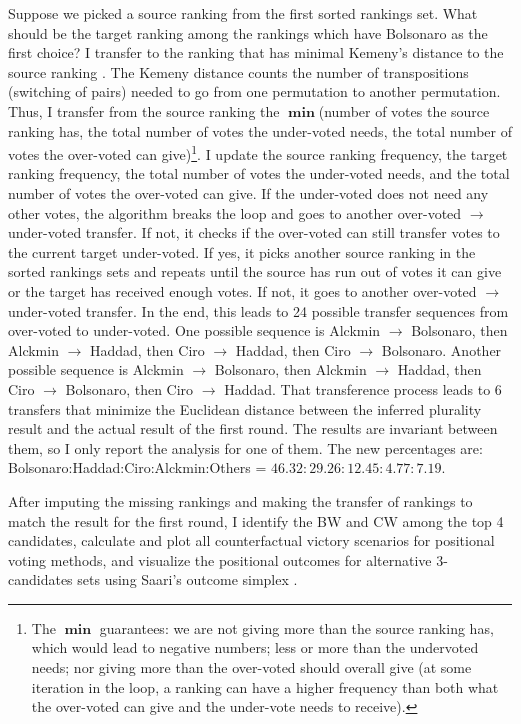 \documentclass[hidelinks,11pt]{article}
\begin{document}
Suppose we picked a source ranking from the first sorted rankings set. What
should be the target ranking among the rankings which have Bolsonaro as the
first choice? I transfer to the ranking that has minimal Kemeny's distance to
the source ranking \parencite{nurmi2002voting}. The Kemeny distance counts the
number of transpositions (switching of pairs) needed to go from one permutation
to another permutation. Thus, I transfer from the source ranking the
\(\operatorname{\mathbf{min}}\)(number of votes the source ranking has, the
total number of votes the under-voted needs, the total number of votes the
over-voted can give)\footnote{The \(\operatorname{\mathbf{min}}\) guarantees: we
are not giving more than the source ranking has, which would lead to negative
numbers; less or more than the undervoted needs; nor giving more than the
over-voted should overall give (at some iteration in the loop, a ranking can
have a higher frequency than both what the over-voted can give and the
under-vote needs to receive).}. I update the source ranking frequency, the
target ranking frequency, the total number of votes the under-voted needs, and
the total number of votes the over-voted can give. If the under-voted does not
need any other votes, the algorithm breaks the loop and goes to another
over-voted \(\to\) under-voted transfer. If not, it checks if the over-voted can
still transfer votes to the current target under-voted. If yes, it picks another
source ranking in the sorted rankings sets and repeats until the source has run
out of votes it can give or the target has received enough votes. If not, it
goes to another over-voted \(\to\) under-voted transfer. In the end, this leads
to 24 possible transfer sequences from over-voted to under-voted. One possible
sequence is Alckmin \(\to\) Bolsonaro, then Alckmin \(\to\) Haddad, then Ciro
\(\to\) Haddad, then Ciro \(\to\) Bolsonaro. Another possible sequence is
Alckmin \(\to\) Bolsonaro, then Alckmin \(\to\) Haddad, then Ciro \(\to\)
Bolsonaro, then Ciro \(\to\) Haddad. That transference process leads to 6
transfers that minimize the Euclidean distance between the inferred plurality
result and the actual result of the first round. The results are invariant
between them, so I only report the analysis for one of them. The new percentages
are: Bolsonaro:Haddad:Ciro:Alckmin:Others = \(46.32:29.26:12.45:4.77:7.19 \).

After imputing the missing rankings and making the transfer of rankings to match
the result for the first round, I identify the BW and CW among the top 4
candidates, calculate and plot all counterfactual victory scenarios for
positional voting methods, and visualize the positional outcomes for alternative
3-candidates sets using Saari's outcome simplex \parencite{saari1995basic}.
\end{document}
